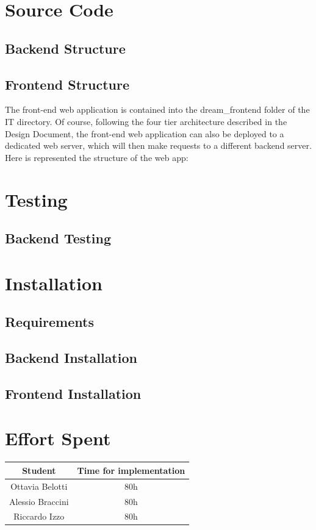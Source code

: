 \documentclass[table, 12pt]{article}
\begin{document}
\section{Source Code}
\subsection{Backend Structure}
\subsection{Frontend Structure}

The front-end web application is contained into the dream\_frontend folder of
the IT directory.
Of course, following the four tier architecture described in the Design Document,
the front-end web application can also be deployed to a dedicated web server,
which will then make requests to a different backend server.
Here is represented the structure of the web app:



\section{Testing}
\subsection{Backend Testing}



\section{Installation}
\subsection{Requirements}
\subsection{Backend Installation}
\subsection{Frontend Installation}

\section{Effort Spent}
\begin{tabular}{|c||c|}
    \hline
    Student & Time for implementation\\ \hline
    Ottavia Belotti & 80h\\
    Alessio Braccini & 80h\\
    Riccardo Izzo & 80h\\
    \hline
\end{tabular}
\end{document}
